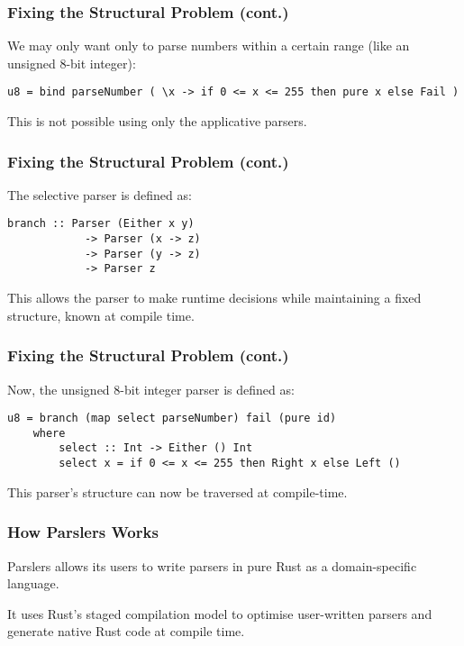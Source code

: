 \documentclass{slides}
\begin{document}
\begin{frame}[fragile]
\frametitle{Fixing the Structural Problem (cont.)}

We may only want only to parse numbers within a certain range (like an unsigned 8-bit integer):

\begin{verbatim}
u8 = bind parseNumber ( \x -> if 0 <= x <= 255 then pure x else Fail )
\end{verbatim}

This is not possible using only the applicative parsers.

\end{frame}

\begin{frame}[fragile]
\frametitle{Fixing the Structural Problem (cont.)}

The selective parser is defined as:

\begin{verbatim}
branch :: Parser (Either x y) 
            -> Parser (x -> z) 
            -> Parser (y -> z) 
            -> Parser z 
\end{verbatim}

This allows the parser to make runtime decisions while maintaining a fixed structure, known at compile time. 

\end{frame}

\begin{frame}[fragile]
\frametitle{Fixing the Structural Problem (cont.)}

Now, the unsigned 8-bit integer parser is defined as:

\begin{verbatim}
u8 = branch (map select parseNumber) fail (pure id)
    where
        select :: Int -> Either () Int 
        select x = if 0 <= x <= 255 then Right x else Left ()
\end{verbatim}

This parser's structure can now be traversed at compile-time.

\end{frame}

\begin{frame}
\frametitle{How Parslers Works}

Parslers allows its users to write parsers in pure Rust as a domain-specific language. 

It uses Rust's staged compilation model to optimise user-written parsers and generate native Rust code at compile time.

\end{frame}
\end{document}
